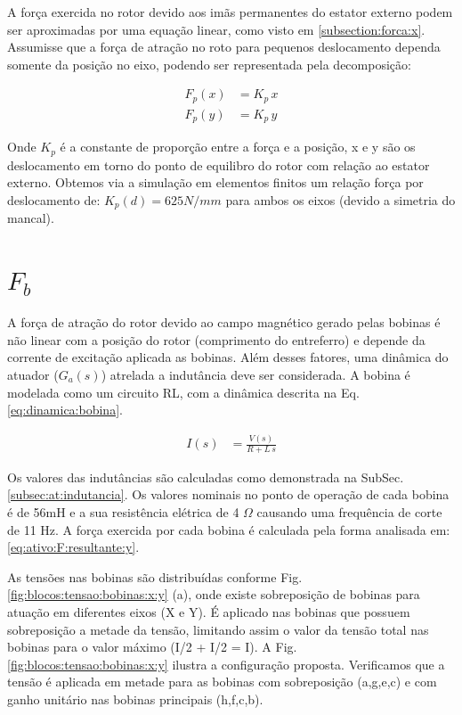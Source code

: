 A força exercida no rotor devido aos imãs permanentes do estator externo podem ser aproximadas por uma equação linear, como visto em \ref{subsection:forca:x}. Assumisse que a força de atração no roto para pequenos deslocamento dependa somente da posição no eixo, podendo ser representada pela decomposição:

\begin{align}
	F_p(x) &= K_p \, x \\
	F_p(y) &= K_p \, y 
\end{align}

Onde $K_p$ é a constante de proporção entre a força e a posição, x e y são os deslocamento em torno do ponto de equilibro do rotor com relação ao estator externo. Obtemos via a simulação em elementos finitos um relação força por deslocamento de: $ K_p(d) = 625 N/mm $  para ambos os eixos (devido a simetria do mancal). 

\section{$F_b$}

A força de atração do rotor devido ao campo magnético gerado pelas bobinas é não linear com a posição do rotor (comprimento do entreferro) e depende da corrente de excitação aplicada as bobinas. Além desses fatores, uma dinâmica do atuador ($G_a(s)$) atrelada a indutância deve ser considerada. A bobina é modelada como um circuito RL, com a dinâmica descrita na Eq. \eqref{eq:dinamica:bobina}.


\begin{align}
	I(s) &= \frac{V(s)}{R + L \, s} 
	\label{eq:dinamica:bobina}
\end{align}

Os valores das indutâncias são calculadas como demonstrada na SubSec. \ref{subsec:at:indutancia}. Os valores nominais no ponto de operação de cada bobina é de 56mH  e a sua resistência elétrica de 4 $\Omega$  causando uma frequência de corte de 11 Hz. A força exercida por cada bobina é calculada pela forma analisada em: \eqref{eq:ativo:F:resultante:y}. 

As tensões nas bobinas são distribuídas conforme Fig. \ref{fig:blocos:tensao:bobinas:x:y} (a), onde existe sobreposição de bobinas para atuação em diferentes eixos (X e Y). É aplicado nas bobinas que possuem sobreposição a metade da tensão, limitando assim o valor da tensão total nas bobinas para o valor máximo (I/2 + I/2 = I). A Fig. \ref{fig:blocos:tensao:bobinas:x:y} ilustra a configuração proposta. Verificamos que a tensão é aplicada em metade para as bobinas com sobreposição (a,g,e,c) e com ganho unitário nas bobinas principais (h,f,c,b). 

